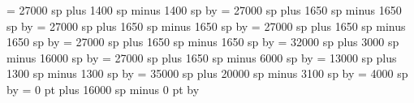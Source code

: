 {%
\spacebeforeminor = 27000 sp plus 1400 sp minus 1400 sp%
\multiply\spacebeforeminor by \grefactor %
%
\spaceafterminor = 27000 sp plus 1650 sp minus 1650 sp%
\multiply\spaceafterminor by \grefactor %
%
\spacebeforemaior = 27000 sp plus 1650 sp minus 1650 sp%
\multiply\spacebeforemaior by \grefactor %
%
\spaceaftermaior = 27000 sp plus 1650 sp minus 1650 sp%
\multiply\spaceaftermaior by \grefactor %
%
\spacebeforefinalis = 27000 sp plus 1650 sp minus 1650 sp%
\multiply\spacebeforefinalis by \grefactor %
%
\spacebeforefinalfinalis= 32000 sp plus 3000 sp minus 16000 sp%
\multiply\spacebeforefinalfinalis by \grefactor %
%
\spaceafterfinalis = 27000 sp plus 1650 sp minus 6000 sp%
\multiply\spaceafterfinalis by \grefactor %
%
\textbartextspace = 13000 sp plus 1300 sp minus 1300 sp%
\multiply\textbartextspace by \grefactor %
%
\notebarspace = 35000 sp plus 20000 sp minus 3100 sp%
\multiply\notebarspace by \grefactor %
%
\maximumspacewithoutdash = 4000 sp%
\multiply\maximumspacewithoutdash by \grefactor %
%
\afterclefnospace = 0 pt plus 16000 sp minus 0 pt%
\multiply\afterclefnospace by \grefactor %
\relax %
}
